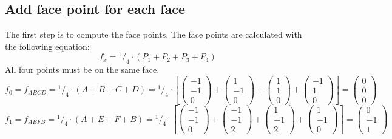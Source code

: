 \documentclass{article}
\newcommand*\rfrac[2]{{}^{#1}\!/_{#2}}%
\begin{document}
\subsection{Add face point for each face}
The first step is to compute the face points. The face points are calculated with the following equation: \[f_x=\rfrac{1}{4}\cdot(P_1+P_2+P_3+P_4) \] All four points must be on the same face.
\[f_0=f_{ABCD}=\rfrac{1}{4}\cdot(A+B+C+D)=\rfrac{1}{4}\cdot\left[
\left({\begin{array}{c} -1 \\  -1 \\ 0 \end{array}}\right)+
\left({\begin{array}{c} 1 \\  -1 \\ 0 \end{array}}\right)+
\left({\begin{array}{c} 1 \\  1 \\ 0 \end{array}}\right)+
\left({\begin{array}{c} -1 \\  1 \\ 0 \end{array}}\right)\right]=
\left({\begin{array}{c} 0 \\ 0 \\ 0 \end{array}}\right)
\]
\[f_1=f_{AEFB}=\rfrac{1}{4}\cdot(A+E+F+B)=\rfrac{1}{4}\cdot\left[
\left({\begin{array}{c} -1 \\  -1 \\ 0 \end{array}}\right)+
\left({\begin{array}{c} -1 \\  -1 \\ 2 \end{array}}\right)+
\left({\begin{array}{c} 1 \\  -1 \\ 2 \end{array}}\right)+
\left({\begin{array}{c} 1 \\  -1 \\ 0 \end{array}}\right)\right]=
\left({\begin{array}{c} 0 \\ -1 \\ 1 \end{array}}\right)
\]
\end{document}
